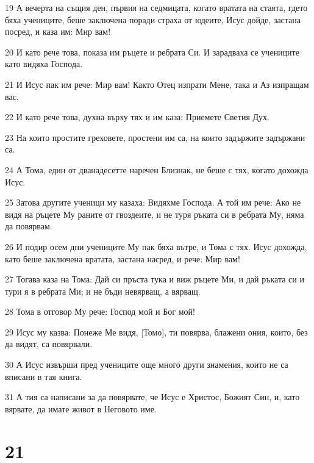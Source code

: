 \par 19 А вечерта на същия ден, първия на седмицата, когато вратата на стаята, гдето бяха учениците, беше заключена поради страха от юдеите, Исус дойде, застана посред, и каза им: Мир вам!
\par 20 И като рече това, показа им ръцете и ребрата Си. И зарадваха се учениците като видяха Господа.
\par 21 И Исус пак им рече: Мир вам! Както Отец изпрати Мене, така и Аз изпращам вас.
\par 22 И като рече това, духна върху тях и им каза: Приемете Светия Дух.
\par 23 На които простите греховете, простени им са, на които задържите задържани са.
\par 24 А Тома, един от дванадесетте наречен Близнак, не беше с тях, когато дохожда Исус.
\par 25 Затова другите ученици му казаха: Видяхме Господа. А той им рече: Ако не видя на ръцете Му раните от гвоздеите, и не туря ръката си в ребрата Му, няма да повярвам.
\par 26 И подир осем дни учениците Му пак бяха вътре, и Тома с тях. Исус дохожда, като беше заключена вратата, застана насред, и рече: Мир вам!
\par 27 Тогава каза на Тома: Дай си пръста тука и виж ръцете Ми, и дай ръката си и тури я в ребрата Ми; и не бъди невярващ, а вярващ.
\par 28 Тома в отговор Му рече: Господ мой и Бог мой!
\par 29 Исус му казва: Понеже Ме видя, [Томо], ти повярва, блажени ония, които, без да видят, са повярвали.
\par 30 А Исус извърши пред учениците още много други знамения, които не са вписани в тая книга.
\par 31 А тия са написани за да повярвате, че Исус е Христос, Божият Син, и, като вярвате, да имате живот в Неговото име.

\chapter{21}

